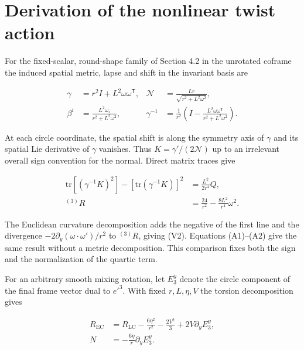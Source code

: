 \section{Derivation of the nonlinear twist action}

\label{app:E}

For the fixed-scalar, round-shape family of Section 4.2 in the unrotated coframe the induced spatial metric, lapse and shift in the invariant basis are

\begin{equation}\tag{E1}\label{eq:E1}
\begin{aligned}
\gamma&=r^2I+L^2\omega\omega^{\mathsf T},&
\mathcal N&=\frac{Lr}{\sqrt{r^2+L^2\omega^2}},\\
\beta^i&=\frac{L^2\omega_i}{r^2+L^2\omega^2},&
\gamma^{-1}&=\frac1{r^2}\left(I-\frac{L^2\omega\omega^{\mathsf T}}{r^2+L^2\omega^2}\right).
\end{aligned}
\end{equation}

At each circle coordinate, the spatial shift is along the symmetry axis of $\gamma$ and its spatial Lie derivative of $\gamma$ vanishes. Thus $K=\gamma'/(2\mathcal N)$ up to an irrelevant overall sign convention for the normal. Direct matrix traces give

\begin{equation}\tag{E2}\label{eq:E2}
\begin{aligned}
\mathrm{tr}\!\left[(\gamma^{-1}K)^2\right]
-\left[\mathrm{tr}(\gamma^{-1}K)\right]^2
&=\frac{L^2}{2r^4}Q,\\
{}^{(3)}R&=\frac{24}{r^2}-\frac{8L^2}{r^4}\omega^2.
\end{aligned}
\end{equation}

The Euclidean curvature decomposition adds the negative of the first line and the divergence $-2\partial_y(\omega\cdot\omega')/r^2$ to $^{(3)}R$, giving (V2). Equations (A1)--(A2) give the same result without a metric decomposition. This comparison fixes both the sign and the normalization of the quartic term.

For an arbitrary smooth mixing rotation, let $E_3^y$ denote the circle component of the final frame vector dual to $e'^3$. With fixed $r,L,\eta,V$ the torsion decomposition gives

\begin{equation}\tag{E3}\label{eq:E3}
\begin{aligned}
R_{\mathrm{EC}}&=R_{\mathrm{LC}}-\frac{6\eta^2}{r^2}-\frac{2V^2}{3}
+2V\partial_yE_3^y,\\
N&=-\frac{6\eta}{r}\partial_yE_3^y.
\end{aligned}
\end{equation}

